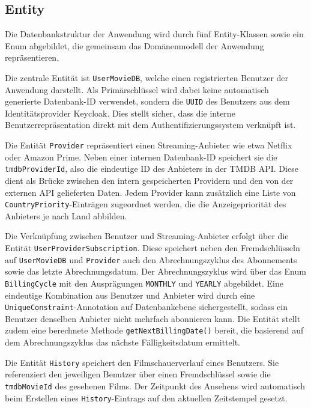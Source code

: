 \subsection{Entity}

Die Datenbankstruktur der Anwendung wird durch fünf Entity-Klassen sowie ein
Enum abgebildet, die gemeinsam das Domänenmodell der Anwendung repräsentieren.

Die zentrale Entität ist \texttt{UserMovieDB}, welche einen registrierten Benutzer
der Anwendung darstellt. Als Primärschlüssel wird dabei keine automatisch generierte
Datenbank-ID verwendet, sondern die \texttt{UUID} des Benutzers aus dem
Identitätsprovider Keycloak. Dies stellt sicher, dass die interne
Benutzerrepräsentation direkt mit dem Authentifizierungssystem verknüpft ist.

Die Entität \texttt{Provider} repräsentiert einen Streaming-Anbieter wie etwa
Netflix oder Amazon Prime. Neben einer internen Datenbank-ID speichert sie die
\texttt{tmdbProviderId}, also die eindeutige ID des Anbieters in der TMDB API.
Diese dient als Brücke zwischen den intern gespeicherten Providern und den von
der externen API gelieferten Daten. Jedem Provider kann zusätzlich eine Liste
von \texttt{CountryPriority}-Einträgen zugeordnet werden, die die Anzeigepriorität
des Anbieters je nach Land abbilden.

Die Verknüpfung zwischen Benutzer und Streaming-Anbieter erfolgt über die
Entität \texttt{UserProviderSubscription}. Diese speichert neben den
Fremdschlüsseln auf \texttt{UserMovieDB} und \texttt{Provider} auch den
Abrechnungszyklus des Abonnements sowie das letzte Abrechnungsdatum. Der
Abrechnungszyklus wird über das Enum \texttt{BillingCycle} mit den
Ausprägungen \texttt{MONTHLY} und \texttt{YEARLY} abgebildet. Eine eindeutige
Kombination aus Benutzer und Anbieter wird durch eine
\texttt{UniqueConstraint}-Annotation auf Datenbankebene sichergestellt, sodass
ein Benutzer denselben Anbieter nicht mehrfach abonnieren kann. Die Entität
stellt zudem eine berechnete Methode \texttt{getNextBillingDate()} bereit, die
basierend auf dem Abrechnungszyklus das nächste Fälligkeitsdatum ermittelt.

Die Entität \texttt{History} speichert den Filmschauerverlauf eines Benutzers.
Sie referenziert den jeweiligen Benutzer über einen Fremdschlüssel sowie die
\texttt{tmdbMovieId} des gesehenen Films. Der Zeitpunkt des Ansehens wird
automatisch beim Erstellen eines \texttt{History}-Eintrags auf den aktuellen
Zeitstempel gesetzt.

